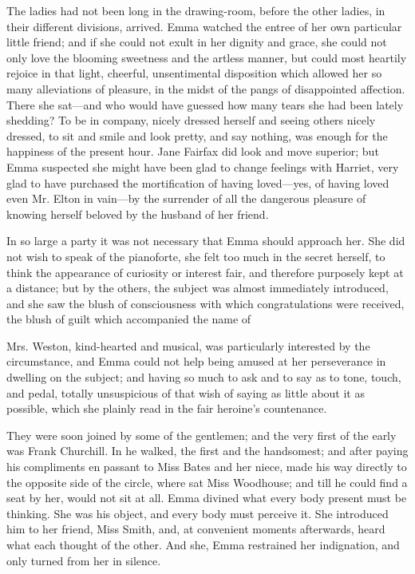 The ladies had not been long in the drawing-room, before the other ladies, in their different divisions, arrived. Emma watched the entree of her own particular little friend; and if she could not exult in her dignity and grace, she could not only love the blooming sweetness and the artless manner, but could most heartily rejoice in that light, cheerful, unsentimental disposition which allowed her so many alleviations of pleasure, in the midst of the pangs of disappointed affection. There she sat---and who would have guessed how many tears she had been lately shedding? To be in company, nicely dressed herself and seeing others nicely dressed, to sit and smile and look pretty, and say nothing, was enough for the happiness of the present hour. Jane Fairfax did look and move superior; but Emma suspected she might have been glad to change feelings with Harriet, very glad to have purchased the mortification of having loved---yes, of having loved even Mr. Elton in vain---by the surrender of all the dangerous pleasure of knowing herself beloved by the husband of her friend.

In so large a party it was not necessary that Emma should approach her. She did not wish to speak of the pianoforte, she felt too much in the secret herself, to think the appearance of curiosity or interest fair, and therefore purposely kept at a distance; but by the others, the subject was almost immediately introduced, and she saw the blush of consciousness with which congratulations were received, the blush of guilt which accompanied the name of 

Mrs. Weston, kind-hearted and musical, was particularly interested by the circumstance, and Emma could not help being amused at her perseverance in dwelling on the subject; and having so much to ask and to say as to tone, touch, and pedal, totally unsuspicious of that wish of saying as little about it as possible, which she plainly read in the fair heroine's countenance.

They were soon joined by some of the gentlemen; and the very first of the early was Frank Churchill. In he walked, the first and the handsomest; and after paying his compliments en passant to Miss Bates and her niece, made his way directly to the opposite side of the circle, where sat Miss Woodhouse; and till he could find a seat by her, would not sit at all. Emma divined what every body present must be thinking. She was his object, and every body must perceive it. She introduced him to her friend, Miss Smith, and, at convenient moments afterwards, heard what each thought of the other.  And she,  Emma restrained her indignation, and only turned from her in silence.


